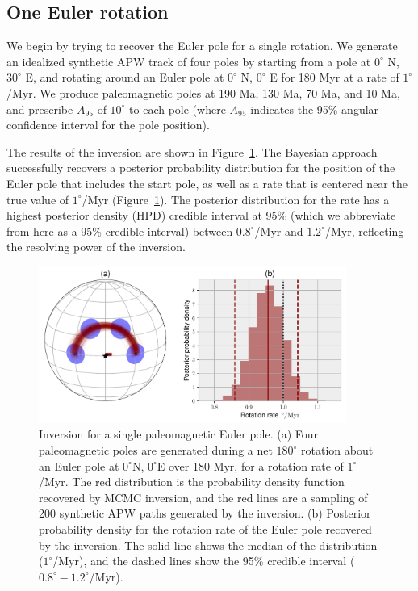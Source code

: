 \documentclass[preprint,12pt,authoryear]{elsarticle}
\begin{document}
\subsection{One Euler rotation}
\label{sec:one_stage_pole}
We begin by trying to recover the Euler pole for a single rotation.
We generate an idealized synthetic APW track of four poles by starting from a pole at $0^\circ$ N, $30^\circ$ E,
and rotating around an Euler pole at $0^\circ$ N, $0^\circ$ E for 180 Myr at a rate of $1^\circ$/Myr.
We produce paleomagnetic poles at 190 Ma, 130 Ma, 70 Ma, and 10 Ma, and prescribe $A_{95}$
of $10^\circ$ to each pole (where $A_{95}$ indicates the 95\% angular confidence interval for the pole position).

The results of the inversion are shown in Figure~\ref{fig:one_euler_pole}.
The Bayesian approach successfully recovers a posterior probability distribution for the position
of the Euler pole that includes the start pole, as well as a rate that is centered
near the true value of $1^\circ$/Myr (Figure~\ref{fig:one_euler_pole}). The posterior distribution for the rate
has a highest posterior density (HPD) credible interval at 95\% 
(which we abbreviate from here as a 95\% credible interval)
between $0.8^\circ$/Myr and $1.2^\circ$/Myr, reflecting the resolving power of the inversion.

\begin{figure}
\includegraphics[width=0.9\textwidth]{figures/synthetic/one_euler_pole.pdf}
\caption[Inversion for a single paleomagnetic Euler pole.]{Inversion for a single paleomagnetic Euler pole. (a) Four paleomagnetic poles are generated during a net $180^\circ$ rotation about an Euler pole at $0^\circ$N, $0^\circ$E over 180 Myr, for a rotation rate of $1^\circ$/Myr. The red distribution is the probability density function recovered by MCMC inversion, and the red lines are a sampling of 200 synthetic APW paths generated by the inversion. (b) Posterior probability density for the rotation rate of the Euler pole recovered by the inversion. The solid line shows the median of the distribution ($1^\circ$/Myr), and the dashed lines show the 95\% credible interval ($0.8^\circ-1.2^\circ$/Myr). }
\label{fig:one_euler_pole}
\end{figure}
\end{document}
